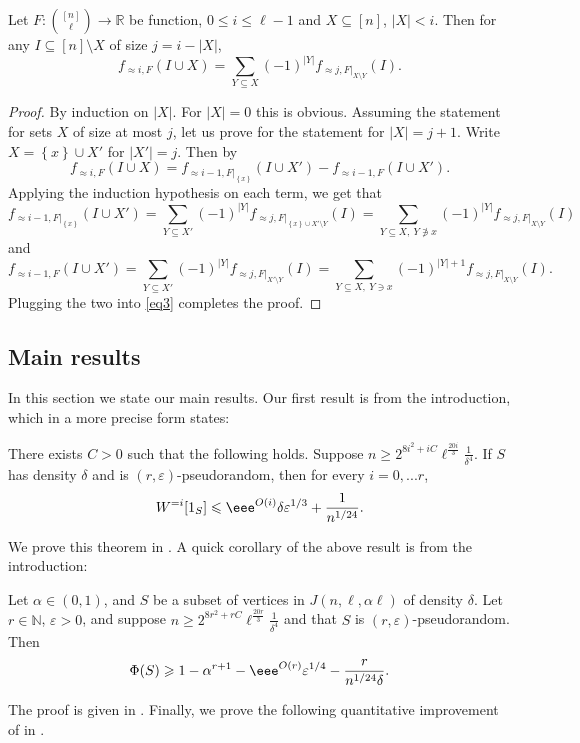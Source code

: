 \documentclass{toc}
\newcommand\card[1]{\left| {#1} \right|}
\newcommand\set[1]{{\left\{ #1 \right\}}}
\newcommand\eps{\varepsilon}
\renewcommand\geq{\geqslant}
\renewcommand\leq{\leqslant}
\newcommand\expp[1]{\eee^{O({#1})}}
\newcommand\approxlvlfn[2]{{#1}_{\approx{#2}}}
\begin{document}
\begin{corollary}\label{corr:restriction}
Let $F\colon {[n]\choose \ell}\to\mathbb{R}$ be function, $0\leq i\leq \ell-1$
and $X\subseteq [n]$, $\card{X}<i$.
Then for any $I\subseteq [n]\setminus X$ of size $j = i-\card{X}$,
\[
\approxlvlfn{f}{i, F}(I\cup X)
= \sum\limits_{Y\subseteq X}{(-1)^{\card{Y}}
\approxlvlfn{f}{j,F|_{X\setminus Y}}(I)}.
\]
\begin{proof}
By induction on $\card{X}$. For $\card{X} = 0$ this is obvious. Assuming the statement
for %
sets $X$  %
of size at most $j$, let us
prove for the statement for $\card{X} = j+1$. Write $X = \set{x}\cup X'$ for $\card{X'} = j$. Then by 
\begin{equation}\label{eq3}
\approxlvlfn{f}{i, F}(I\cup X)
=
\approxlvlfn{f}{i-1, F|_{\set{x}}}(I\cup X')
-\approxlvlfn{f}{i-1, F}(I\cup X').
\end{equation}
Applying the induction hypothesis on each term, we get that
\[
\approxlvlfn{f}{i-1, F|_{\set{x}}}(I\cup X')
= \sum\limits_{Y\subseteq X'}{(-1)^{\card{Y}}
\approxlvlfn{f}{j,F|_{\set{x} \cup X'\setminus Y}}(I)}
= \sum\limits_{Y\subseteq X, ~Y\not\ni x}{(-1)^{\card{Y}}
\approxlvlfn{f}{j,F|_{X \setminus Y}}(I)}
\]
and
\[
\approxlvlfn{f}{i-1, F}(I\cup X')
= \sum\limits_{Y\subseteq X'}{(-1)^{\card{Y}}
\approxlvlfn{f}{j,F|_{X'\setminus Y}}(I)}
= \sum\limits_{Y\subseteq X, ~Y\ni x}{(-1)^{\card{Y}+1}
\approxlvlfn{f}{j,F|_{X\setminus Y}}(I)}.
\]
Plugging the two into \eqref{eq3} completes the proof.
\end{proof}
\end{corollary}





\subsection{Main results}
In this section %
we state our main results.
%
%
Our first result is  from the introduction, which in a more
precise form states:
\begin{theorem}\label{thm:main}
There exists $C>0$ such that the following holds. Suppose $n\geq 2^{8i^2+iC}\ell^{\frac{20i}{3}}\frac{1}{\delta^4}$.
If $S$ has density $\delta$ and is $(r,\eps)$-pseudorandom, then for every $i=0,...r$,
\[
W^{=i}[1_S] \leq \expp{i} \delta\eps^{1/3} + \frac{1}{n^{1/24}}.
\]
%
\end{theorem}
We prove this theorem in .
A quick corollary of the above result is  from the introduction:
\begin{theorem}\label{thm:main2}
Let $\alpha\in(0,1)$, and $S$ be a subset of vertices in $J(n,\ell,\alpha \ell)$
of density $\delta$. Let $r\in\mathbb{N}$, $\eps>0$, and suppose $n\geq 2^{8r^2+rC}\ell^{\frac{20r}{3}}\frac{1}{\delta^4}$
and that $S$ is $(r,\eps)$-pseudorandom. Then
\[
\Phi(S) \geq 1 - \alpha^{r+1} - \expp{r} \eps^{1/4} - \frac{r}{n^{1/24}\delta}.
\]
\end{theorem}
The proof is given in .
Finally, we prove the following quantitative improvement of  in .
\end{document}
